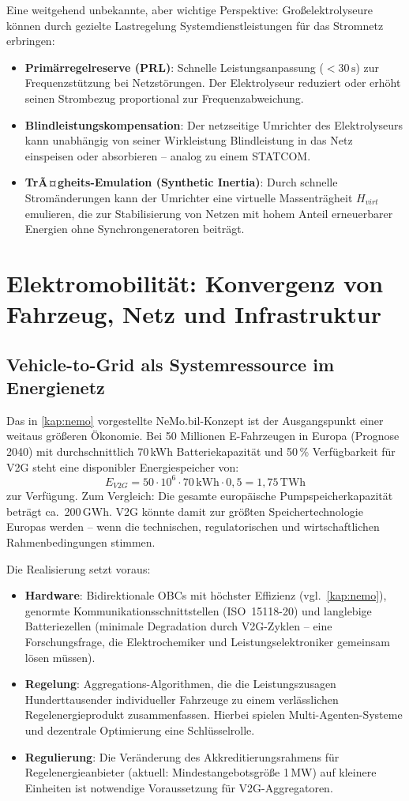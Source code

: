 ﻿\documentclass[a4paper,12pt,openany,oneside]{book}
\newcommand{\abschnitt}[1]{\section{#1}}
\newcommand{\unterabschnitt}[1]{\subsection{#1}}
\theoremstyle{definition}
\begin{document}
Eine weitgehend unbekannte, aber wichtige Perspektive: Gro\ss{}elektrolyseure k\"onnen
durch gezielte Lastregelung Systemdienstleistungen f\"ur das Stromnetz erbringen:
\begin{itemize}
  \item \textbf{Prim\"arregelreserve (PRL)}: Schnelle Leistungsanpassung ($< 30\,\mathrm{s}$)
    zur Frequenzst\"utzung bei Netzst\"orungen. Der Elektrolyseur reduziert oder erh\"oht
    seinen Strombezug proportional zur Frequenzabweichung.
  \item \textbf{Blindleistungskompensation}: Der netzseitige Umrichter des Elektrolyseurs
    kann unabh\"angig von seiner Wirkleistung Blindleistung in das Netz einspeisen oder
    absorbieren -- analog zu einem STATCOM.
  \item \textbf{TrÃ¤gheits-Emulation (Synthetic Inertia)}: Durch schnelle Strom\"anderungen
    kann der Umrichter eine virtuelle Massentr\"agheit $H_{virt}$ emulieren, die zur
    Stabilisierung von Netzen mit hohem Anteil erneuerbarer Energien ohne Synchrongeneratoren
    beitr\"agt.
\end{itemize}

\abschnitt{Elektromobilit\"at: Konvergenz von Fahrzeug, Netz und Infrastruktur}

\unterabschnitt{Vehicle-to-Grid als Systemressource im Energienetz}

Das in \autoref{kap:nemo} vorgestellte NeMo.bil-Konzept ist der Ausgangspunkt einer
weitaus gr\"o\ss{}eren \"Okonomie. Bei 50 Millionen E-Fahrzeugen in Europa (Prognose 2040)
mit durchschnittlich 70\,kWh Batteriekapazit\"at und 50\,\% Verf\"ugbarkeit f\"ur V2G
steht eine disponibler Energiespeicher von:
\[
  E_{V2G} = 50 \cdot 10^6 \cdot 70\,\mathrm{kWh} \cdot 0{,}5 = 1{,}75\,\mathrm{TWh}
\]
zur Verf\"ugung. Zum Vergleich: Die gesamte europ\"aische Pumpspeicherkapazit\"at betr\"agt
ca.\ 200\,GWh. V2G k\"onnte damit zur gr\"o\ss{}ten Speichertechnologie Europas werden --
wenn die technischen, regulatorischen und wirtschaftlichen Rahmenbedingungen stimmen.

Die Realisierung setzt voraus:
\begin{itemize}
  \item \textbf{Hardware}: Bidirektionale OBCs mit h\"ochster Effizienz (vgl.\ \autoref{kap:nemo}),
    genormte Kommunikationsschnittstellen (ISO~15118-20) und langlebige Batteriezellen
    (minimale Degradation durch V2G-Zyklen -- eine Forschungsfrage, die Elektrochemiker und
    Leistungselektroniker gemeinsam l\"osen m\"ussen).
  \item \textbf{Regelung}: Aggregations-Algorithmen, die die Leistungszusagen Hunderttausender
    individueller Fahrzeuge zu einem verl\"asslichen Regelenergieprodukt zusammenfassen.
    Hierbei spielen Multi-Agenten-Systeme und dezentrale Optimierung eine Schl\"usselrolle.
  \item \textbf{Regulierung}: Die Ver\"anderung des Akkreditierungsrahmens f\"ur
    Regelenergieanbieter (aktuell: Mindestangebotsgr\"o\ss{}e 1\,MW) auf kleinere
    Einheiten ist notwendige Voraussetzung f\"ur V2G-Aggregatoren.
\end{itemize}
\end{document}
